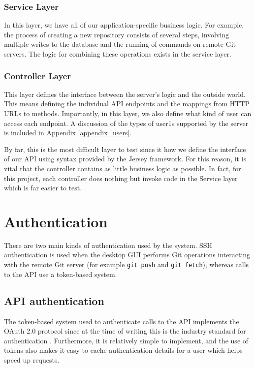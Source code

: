 \subsubsection{Service Layer}

In this layer, we have all of our application-specific business logic. For example, the process of creating a new repository consists of several steps, involving multiple writes to the database and the running of commands on remote Git servers. The logic for combining these operations exists in the service layer.

\subsubsection{Controller Layer}

This layer defines the interface between the server's logic and the outside world. This means defining the individual API endpoints and the mappings from HTTP URLs to methods. Importantly, in this layer, we also define what kind of user can access each endpoint. A discussion of the types of user1s supported by the server is included in Appendix \ref{appendix_users}.

By far, this is the most difficult layer to test since it how we define the interface of our API using syntax provided by the Jersey framework. For this reason, it is vital that the controller contains as little business logic as possible. In fact, for this project, each controller does nothing but invoke code in the Service layer which is far easier to test.

\section{Authentication}

There are two main kinds of authentication used by the system. SSH authentication is used when the desktop GUI performs Git operations interacting with the remote Git server (for example \texttt{git push} and \texttt{git fetch}), whereas calls to the API use a token-based system. 

\subsection{API authentication}

The token-based system used to authenticate calls to the API implements the OAuth 2.0 protocol since at the time of writing this is the industry standard for authentication \cite{oauth2}. Furthermore, it is relatively simple to implement, and the use of tokens also makes it easy to cache authentication details for a user which helps speed up requests.

